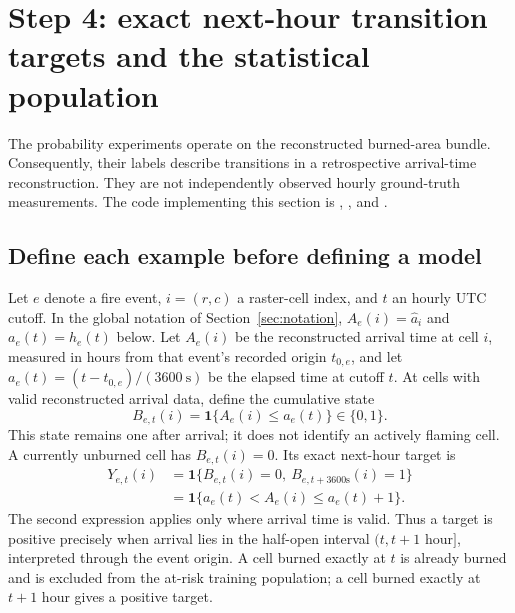 \documentclass[11pt,a4paper]{article}
\newcommand{\Ind}{\mathbf{1}}
\begin{document}
\section{Step 4: exact next-hour transition targets and the statistical population}
\label{sec:probability-targets}

The probability experiments operate on the reconstructed burned-area bundle.
Consequently, their labels describe transitions in a retrospective arrival-time
reconstruction. They are not independently observed hourly ground-truth
measurements. The code implementing this section is
,
, and
.\cite{codeprob}

\subsection{Define each example before defining a model}

Let $e$ denote a fire event, $i=(r,c)$ a raster-cell index, and $t$ an
hourly UTC cutoff. In the global notation of Section~\ref{sec:notation},
$A_e(i)=\widehat a_i$ and $a_e(t)=h_e(t)$ below. Let $A_e(i)$ be the reconstructed arrival time at cell $i$,
measured in hours from that event's recorded origin $t_{0,e}$, and let
$a_e(t)=(t-t_{0,e})/(3600\ \mathrm{s})$ be the elapsed time at cutoff $t$.
At cells with valid reconstructed arrival data, define the cumulative state
\begin{equation}
 B_{e,t}(i)=\Ind\{A_e(i)\leq a_e(t)\}\in\{0,1\}.
 \label{eq:prob-cumulative-state}
\end{equation}
This state remains one after arrival; it does not identify an actively flaming
cell. A currently unburned cell has $B_{e,t}(i)=0$. Its exact next-hour target is
\begin{align}
 Y_{e,t}(i)
 &=\Ind\{B_{e,t}(i)=0,\ B_{e,t+3600\mathrm{s}}(i)=1\}\nonumber\\
 &=\Ind\{a_e(t)<A_e(i)\leq a_e(t)+1\}.
 \label{eq:prob-next-hour-target}
\end{align}
The second expression applies only where arrival time is valid. Thus a target
is positive precisely when arrival lies in the half-open interval $(t,t+1
\text{ hour}]$, interpreted through the event origin. A cell burned exactly
at $t$ is already burned and is excluded from the at-risk training population;
a cell burned exactly at $t+1$ hour gives a positive target.
\end{document}
